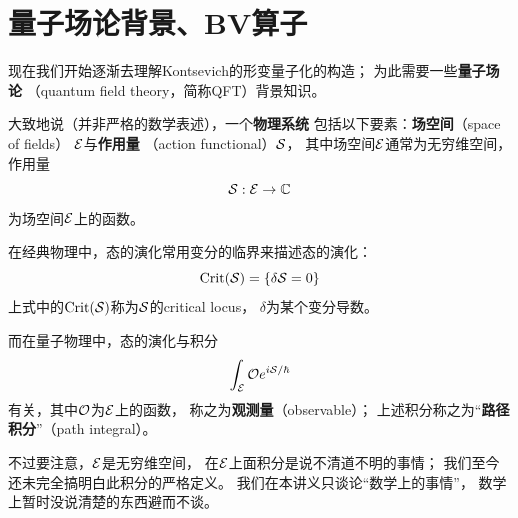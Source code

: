 

\section{量子场论背景、BV算子}
现在我们开始逐渐去理解Kontsevich的形变量子化的构造；
为此需要一些\textbf{量子场论}
（quantum field theory，简称QFT）背景知识。


大致地说（并非严格的数学表述），一个\textbf{物理系统}
包括以下要素：\textbf{场空间}（space of fields）
$\mathcal{E}$与\textbf{作用量}
（action functional）$\mathcal{S}$，
其中场空间$\mathcal{E}$通常为无穷维空间，作用量
$$\mathcal{S}:\mathcal{E}\to \mathbb{C}$$
为场空间$\mathcal{E}$上的函数。

在经典物理中，态的演化常用变分的临界来描述态的演化：
$$\operatorname{Crit}(\mathcal{S})=\{\delta\mathcal{S}=0\}$$
上式中的$\operatorname{Crit}(\mathcal{S})$称为$\mathcal{S}$的critical locus，
$\delta$为某个变分导数。

而在量子物理中，态的演化与积分
$$\int_{\mathcal{E}}\mathcal{O} e^{i\mathcal{S}/\hbar}$$
有关，其中$\mathcal{O}$为$\mathcal{E}$上的函数，
称之为\textbf{观测量}（observable）；
上述积分称之为“\textbf{路径积分}”（path integral）。

不过要注意，$\mathcal{E}$是无穷维空间，
在$\mathcal{E}$上面积分是说不清道不明的事情；
我们至今还未完全搞明白此积分的严格定义。
我们在本讲义只谈论“数学上的事情”，
数学上暂时没说清楚的东西避而不谈。



